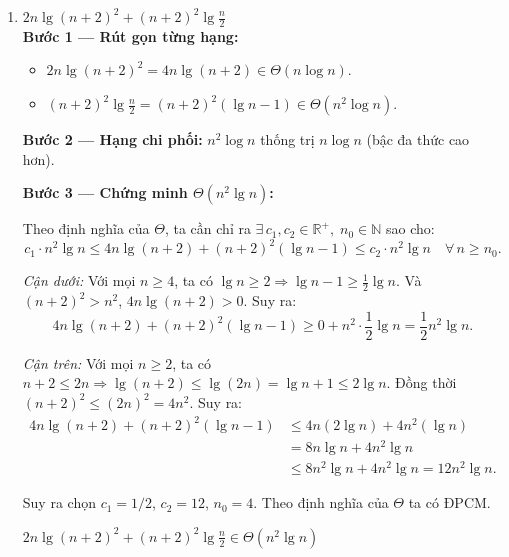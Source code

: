 \documentclass[12pt,a4paper]{article}
\begin{document}
\begin{enumerate}[label=\textbf{\alph*.}]
  Suy ra chọn $c_1 = \sqrt{10}$, $c_2 = \sqrt{20}$, $n_0 = 1$. Theo định nghĩa của $\Theta$ ta có ĐPCM.

  \begin{resultbox}
  $\sqrt{10n^2 + 7n + 3} \in \Theta(n)$
  \end{resultbox}

  \bigskip

  \item $2n\lg(n+2)^2 + (n+2)^2\lg\frac{n}{2}$ \\[4pt]
  \textbf{Bước 1 --- Rút gọn từng hạng:}
  \begin{itemize}[noitemsep]
    \item $2n\lg(n+2)^2 = 4n\lg(n+2) \in \Theta(n\log n)$.
    \item $(n+2)^2\lg\frac{n}{2} = (n+2)^2(\lg n - 1) \in \Theta(n^2 \log n)$.
  \end{itemize}

  \textbf{Bước 2 --- Hạng chi phối:} $n^2\log n$ thống trị $n\log n$ (bậc đa thức cao hơn).

  \textbf{Bước 3 --- Chứng minh $\Theta(n^2\lg n)$:}

  Theo định nghĩa của $\Theta$, ta cần chỉ ra $\exists\, c_1, c_2 \in \mathbb{R}^+,\; n_0 \in \mathbb{N}$ sao cho:
  \[
    c_1 \cdot n^2\lg n \leq 4n\lg(n+2) + (n+2)^2(\lg n - 1) \leq c_2 \cdot n^2\lg n \quad \forall\, n \geq n_0.
  \]

  \textit{Cận dưới:} Với mọi $n \geq 4$, ta có $\lg n \geq 2 \Rightarrow \lg n - 1 \geq \frac{1}{2}\lg n$. Và $(n+2)^2 > n^2$, $4n\lg(n+2) > 0$. Suy ra:
  \[
    4n\lg(n+2) + (n+2)^2(\lg n - 1) \geq 0 + n^2 \cdot \frac{1}{2}\lg n = \frac{1}{2} n^2\lg n.
  \]

  \textit{Cận trên:} Với mọi $n \geq 2$, ta có $n+2 \leq 2n \Rightarrow \lg(n+2) \leq \lg(2n) = \lg n + 1 \leq 2\lg n$.
  Đồng thời $(n+2)^2 \leq (2n)^2 = 4n^2$. Suy ra:
  \begin{align*}
    4n\lg(n+2) + (n+2)^2(\lg n - 1) &\leq 4n(2\lg n) + 4n^2(\lg n) \\
    &= 8n\lg n + 4n^2\lg n \\
    &\leq 8n^2\lg n + 4n^2\lg n = 12n^2\lg n.
  \end{align*}

  Suy ra chọn $c_1 = 1/2$, $c_2 = 12$, $n_0 = 4$. Theo định nghĩa của $\Theta$ ta có ĐPCM.

  \begin{resultbox}
  $2n\lg(n+2)^2 + (n+2)^2\lg\frac{n}{2} \in \Theta(n^2\lg n)$
  \end{resultbox}


\end{enumerate}
\end{document}
